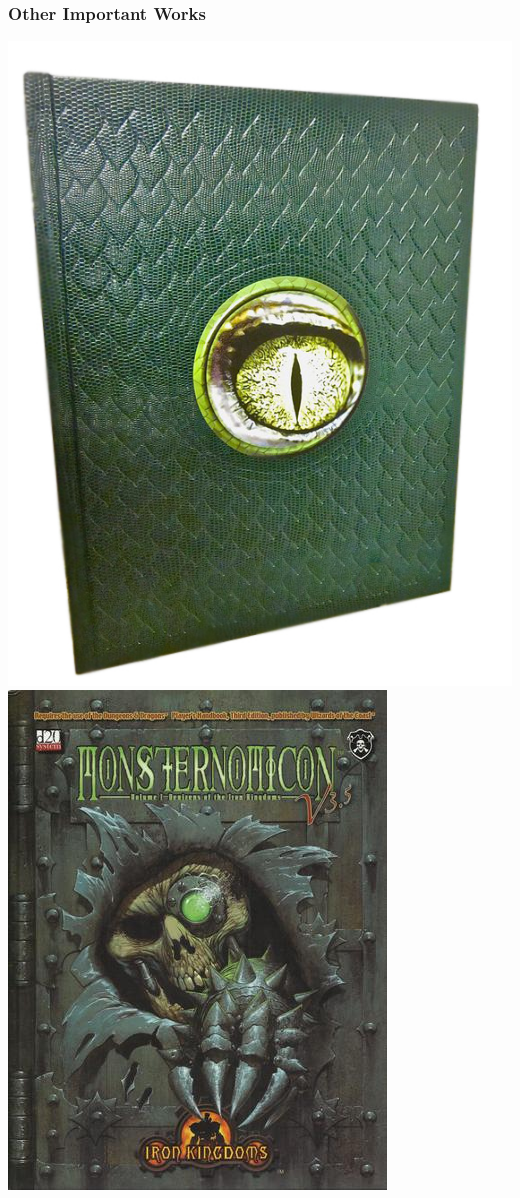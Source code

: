 \documentclass{beamer}\usepackage{graphicx, color}
\begin{document}
\begin{frame}
\end{frame}

\begin{frame}
  \frametitle{Other Important Works}
  \begin{center}
  \noindent
  \includegraphics[height = 0.4\textheight, keepaspectratio = true]{hack}\hspace{0.2\textwidth}%
  \includegraphics[height = 0.4\textheight, keepaspectratio = true]{nomicon}\\[2em]

\end{center}
\end{frame}
\end{document}
